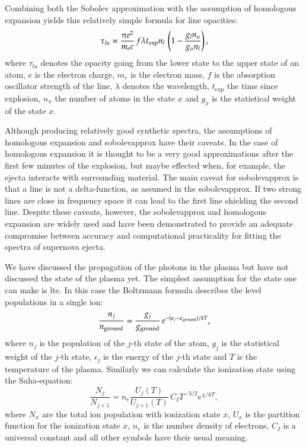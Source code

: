 Combining both the Sobolev approximation with the assumption of homologous expansion yields this relatively simple formula for line opacities:
\begin{equation}
\label{eq:sobolevapprox}
\tau_{lu} = \frac{\pi e^2}{m_e c}\, f \lambda t_{\rm exp} n_l\, \left(1 - \frac{g_l n_u}{g_u n_l}\right), 
\end{equation}
where $\tau_{lu}$ denotes the opacity going from the lower state to the upper state of an atom, $e$ is the electron charge, $m_e$ is the electron mass, $f$ is the absorption oscillator strength of the line, $\lambda$ denotes the wavelength, $t_\textrm{exp}$ the time since explosion, $n_x$ the number of atoms in the state $x$ and $g_x$ is the statistical weight of the state $x$.

Although producing relatively good synthetic spectra, the assumptions of homologous expansion and \gls{sobolevapprox} have their caveats. In the case of homologous expansion it is thought to be a very good approximations after the first few minutes of the explosion, but maybe effected when, for example, the ejecta interacts with surrounding material. The main caveat for \gls{sobolevapprox} is that a line is not a delta-function, as assumed in the \gls{sobolevapprox}. If two strong lines are close in frequency space it can lead to the first line shielding the second line. Despite these caveats, however, the \gls{sobolevapprox} and homologous expansion are widely used and have been demonstrated to provide an adequate compromise between accuracy and computational practicality for fitting the spectra of supernova ejecta.

We have discussed the propagation of the photons in the plasma but have not discussed the state of the plasma yet. The simplest assumption for the state one can make is \gls{lte}. In this case the Boltzmann formula describes the level populations in a single ion:
\[
\frac{n_j}{n_{\rm ground}} = \frac{g_j}{g_{\rm ground}}\,e^{-(\epsilon_j - \epsilon_{\rm ground})/kT},
\]
where $n_j$ is the population of the $j$-th state of the atom, $g_j$ is the statistical weight of the $j$-th state, $\epsilon_j$ is the energy of the $j$-th state and $T$ is the temperature of the plasma.
Similarly we can calculate the ionization state using the Saha-equation:
\[
	\frac{N_j}{N_{j+1}} = n_e \frac{U_j(T)}{U_{j+1}(T)}\,C_I T^{-3/2} e^{\chi/kT},
\]
where $N_x$ are the total ion population with ionization state $x$, $U_x$ is the partition function for the ionization state $x$, $n_e$ is the number density of electrons, $C_I$ is a universal constant and all other symbols have their usual meaning. 


